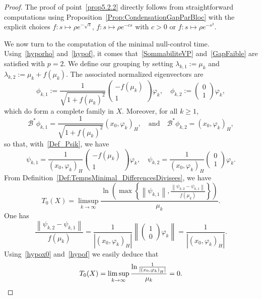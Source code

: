 \documentclass[11pt]{article}
\theoremstyle{definition}
\numberwithin{equation}{section}
\numberwithin{figure}{section}
\numberwithin{table}{section}
\newcommand\Bs{\mathcal{B}^*}
\newcommand{\normeX}[1]{\left\| #1 \right\|}
\newcommand{\psH}[2]{\left(#1, #2 \right)_H}
\begin{document}
\begin{proof}
The proof of point~\eqref{prop5.2.2} directly follows from straightforward computations using Proposition~\ref{Prop:CondensationGapParBloc} with the explicit choices $f : s \mapsto \rho e^{-\sqrt{s}}$, $ f : s \mapsto \rho e^{-cs}$ with $c >0$ or $f : s \mapsto \rho e^{-s^2}$.

We now turn to the computation of the minimal null-control time. Using~\eqref{hyporho} and~\eqref{hypof}, it comes that~\eqref{SommabiliteVP} and~\eqref{GapFaible} are satisfied with $p=2$. We define our grouping by setting $\lambda_{k,1}:=\mu_k$ and $\lambda_{k,2}:=\mu_k+f(\mu_k)$. The associated normalized eigenvectors are
\[
\phi_{k,1} := \frac{1}{\sqrt{1+f(\mu_k)^2}}
\begin{pmatrix} -f(\mu_k) \\ 1
\end{pmatrix} \varphi_k,
\quad
\phi_{k,2} :=
\begin{pmatrix} 0 \\ 1
\end{pmatrix} \varphi_k,
\]
which do form a complete family in $X$. Moreover, for all $k \geq 1$,
\[
\Bs \phi_{k,1}= \frac{1}{\sqrt{1+f(\mu_k)^2}} \psH{x_0}{\varphi_k},
\quad \text{and} \quad
\Bs \phi_{k,2}= \psH{x_0}{\varphi_k},
\]
so that, with~\eqref{Def_Psik}, we have
\[
\psi_{k,1} = \frac{1}{\psH{x_0}{\varphi_k}}
\begin{pmatrix} -f(\mu_k) \\ 1
\end{pmatrix} \varphi_k,
\quad
\psi_{k,2} = \frac{1}{\psH{x_0}{\varphi_k}}
\begin{pmatrix} 0 \\ 1
\end{pmatrix} \varphi_k.
\]
From Definition~\eqref{Def:TempsMinimal_DifferencesDivisees}, we have
\[
T_0(X) = \limsup_{k \to \infty}\frac{\ln \left(\max \left\{ \normeX{\psi_{k,1}}, \frac{ \normeX{\psi_{k,2}-\psi_{k,1}} }{f(\mu_k)} \right\}\right) }{\mu_k}.
\]
One has
\begin{equation}\label{ExemplesCompensation}
\frac{ \normeX{\psi_{k,2}-\psi_{k,1}} }{f(\mu_k)} = \frac{1}{| \psH{x_0}{\varphi_k} |} \normeX{
\begin{pmatrix} 1 \\ 0
\end{pmatrix} \varphi_k} = \frac{1}{| \psH{x_0}{\varphi_k} |}.
\end{equation}
Using~\eqref{hypox0} and~\eqref{hypof} we easily deduce that
\[
T_0(X) = \limsup_{k \to \infty}\frac{\ln \frac{1}{| \psH{x_0}{\varphi_k} |}}{\mu_k} = 0.\qedhere
\]
\end{proof}
\end{document}
